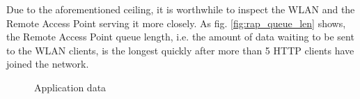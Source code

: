 \documentclass[
10pt, %
a4paper, %
oneside, %
headinclude,footinclude, %
BCOR5mm, %
]{scrartcl}
\begin{document}
Due to the aforementioned ceiling, it is worthwhile to inspect the WLAN and the Remote Access Point serving it more closely. As fig. \ref{fig:rap_queue_len} shows, the Remote Access Point queue length, i.e. the amount of data waiting to be sent to the WLAN clients, is the longest quickly after more than 5 HTTP clients have joined the network.

\begin{figure}[!ht]%
    \caption{Application data}%
    \label{fig:app_data}%
\end{figure}
\end{document}
